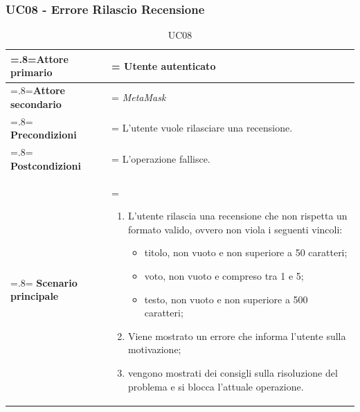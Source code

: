         \subsubsection{UC08 - Errore Rilascio Recensione}
        \label{UC08}

            \begin{table}[H]
                \centering
                \renewcommand{\arraystretch}{1.8}
                \renewcommand\tabularxcolumn[1]{m{#1}}
                \begin{tabularx}{0.9\textwidth} {
                    >{\hsize=.8\hsize\linewidth=\hsize}X
                    >{\hsize=1.2\hsize\linewidth=\hsize}X}
                    \hline
                    \textbf{Attore primario} & Utente autenticato \\
                    \hline
                    \textbf{Attore secondario} & \textit{MetaMask} \\
                    \hline
                    \textbf{Precondizioni} & L'utente vuole rilasciare una recensione. \\
                    \hline
                    \textbf{Postcondizioni} & L'operazione fallisce. \\
                    \hline
                    \textbf{Scenario principale} &
                        \begin{enumerate}
                            \item L'utente rilascia una recensione che non rispetta un formato valido, ovvero non viola i seguenti vincoli:
                            \begin{itemize}
                                \item titolo, non vuoto e non superiore a 50 caratteri;
                                \item voto, non vuoto e compreso tra 1 e 5;
                                \item testo, non vuoto e non superiore a 500 caratteri;
                            \end{itemize}
                            \item Viene mostrato un errore che informa l'utente sulla motivazione;
                            \item vengono mostrati dei consigli sulla risoluzione del problema e si blocca
                            l'attuale operazione.
                        \end{enumerate} \\
                    \hline
                \end{tabularx}
                \caption{UC08}
            \end{table}


